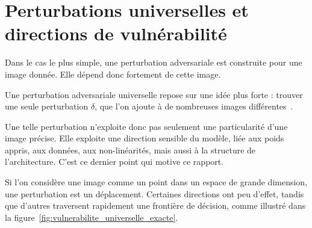 \section{Perturbations universelles et directions de vulnérabilité}

Dans le cas le plus simple, une perturbation adversariale est construite pour une image donnée. Elle dépend donc fortement de cette image.

Une perturbation adversariale universelle repose sur une idée plus forte : trouver une seule perturbation $\delta$, que l'on ajoute à de nombreuses images 
différentes~\cite{moosavi2017universal}.

Une telle perturbation n'exploite donc pas seulement une particularité d'une image précise. Elle exploite une direction sensible du modèle, liée aux poids appris, 
aux données, aux non-linéarités, mais aussi à la structure de l'architecture. C'est ce dernier point qui motive ce rapport.

Si l'on considère une image comme un point dans un espace de grande dimension, une perturbation est un déplacement. Certaines directions ont peu d'effet, 
tandis que d'autres traversent rapidement une frontière de décision, comme illustré dans la figure~\ref{fig:vulnerabilite_universelle_exacte}. 

